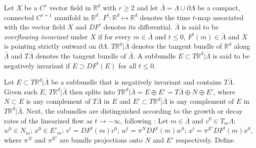 \documentclass[11pt]{article}
\def\blue{\color{blue}}
\newcommand{\tcb}{}
\theoremstyle{remark}
\begin{document}
Let $X$ be a $C^{r}$ vector field in $\mathbb{R}^d$ with $r\ge2$ and let $\bar{\Lambda}=\Lambda \cup \partial \Lambda$ be a compact, connected $C^{r+1}$ manifold in $\mathbb{R}^d$. $F^t: \mathbb{R}^d \mapsto \mathbb{R}^d$ denotes the time $t$-map associated with the vector field $X$ and $DF^t$ denotes its differential.
$\bar{\Lambda}$ is said to be {\it overflowing invariant} under $X$ if for every $m\in\bar{\Lambda}$ and $t\le0$, $F^t(m)\in \bar{\Lambda}$ and $X$ is pointing strictly outward on $\partial \Lambda$. $T \mathbb{R}^d|\bar\Lambda$ denotes the tangent bundle of $\mathbb{R}^d$ along $\bar\Lambda$ and $T\bar\Lambda$ denotes the tangent bundle of $\bar\Lambda$. A subbundle $E\subset T\mathbb{R}^d|\bar{\Lambda}$ is said to be negatively invariant if $E \supset DF^t(E)$ for all $t\le0$.

Let $E\subset T\mathbb{R}^d|\bar{\Lambda}$ be a subbundle that is negatively invariant and contains $T\bar\Lambda$. Given such $E$,  $T \mathbb{R}^d| \bar\Lambda$ then splits into $T\mathbb{R}^d|\bar{\Lambda} =E\oplus E'= T\bar\Lambda\oplus N\oplus E'$, where $N\subset E$ is any complement of $T\bar\Lambda$ in $E$ and $E'\subset T\mathbb{R}^d|\bar{\Lambda}$ is any complement of $E$ in $T\mathbb{R}^d|\bar{\Lambda}$.
\tcb{ Next, the subundles are distinguished according to the growth or decay rates of the linearized flow as $t \to -\infty$,
%
following  \cite{fenichel_geometric_1979}:}
Let $m\in \bar{\Lambda}$ and $v^0 \in T_m \Lambda$; $w^0\in N_m$; $x^0\in E'_m$; $v^t = DF^t(m)v^0$; $w^t = \pi^N DF^t(m)w^0$; $x^t = \pi^{E'}DF^t(m)x^0$,
where $\pi^N$ and $\pi^{E'}$ are bundle projections onto $N$ and $E'$ respectively. Define
\end{document}
